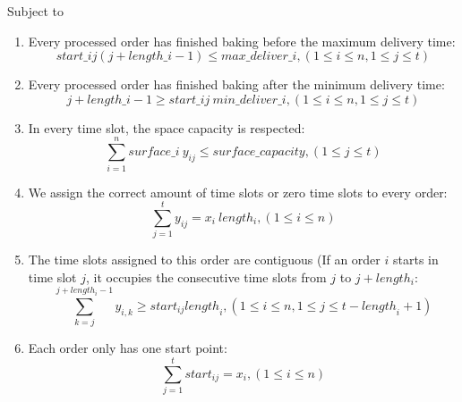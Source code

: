\documentclass{article}
\begin{document}
Subject to
\begin{enumerate}
    \item Every processed order has finished baking before the maximum delivery time: 
    \begin{equation}
    \mathit{start\_{ij}}(j + \mathit{length\_i} - 1) \leq \mathit{max\_deliver\_i}, (1 \leq i \leq n, 1 \leq j \leq t)
    \end{equation}
    \item Every processed order has finished baking after the minimum delivery time:
    \begin{equation}
        j + \mathit{length\_i} - 1 \geq \mathit{start\_{ij}} \: \mathit{min\_deliver\_i}, (1 \leq i \leq n, 1 \leq j \leq t) 
    \end{equation}
    \item In every time slot, the space capacity is respected:
    \begin{equation}
        \sum^n_{i=1}\mathit{surface\_i} \: y_{ij} \leq \mathit{surface\_capacity}, (1 \leq j \leq t)
    \end{equation}
    \item We assign the correct amount of time slots or zero time slots to every order:
    \begin{equation}
        \sum^t_{j = 1} y_{ij} = x_i \: \mathit{length_i}, (1 \leq i \leq n)
    \end{equation}
    \item The time slots assigned to this order are contiguous (If an order $i$ starts in time slot $j$, it occupies the consecutive time slots from $j$ to $j + length_i$:
        \begin{equation}
        \sum^{j+\mathit{length_i}-1}_{k=j} y_{i,k} \geq \mathit{start_{ij}} \mathit{length}_i, (1 \leq i \leq n, 1 \leq j \leq t - \mathit{length}_i + 1 )
    \end{equation}
    \item Each order only has one start point:
    \begin{equation}
    \sum^{t}_{j = 1} \mathit{start}_{ij} = x_i, (1 \leq i \leq n)
    \end{equation}
\end{enumerate}
\end{document}
